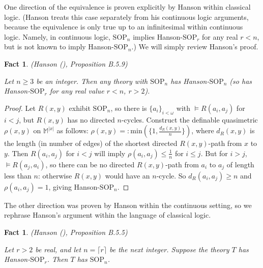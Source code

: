 \documentclass{amsart}
\newtheorem{fact}[theorem]{Fact}
\theoremstyle{definition}
\theoremstyle{remark}
\numberwithin{equation}{section}
\begin{document}
One direction of the equivalence is proven explicitly by Hanson within classical logic. (Hanson treats this case separately from his continuous logic arguments, because the equivalence is only true up to an infinitesimal within continuous logic. Namely, in continuous logic, $\mathrm{SOP}_{n}$ implies Hanson-$\mathrm{SOP}_{r}$ for any real $r < n$, but is not known to imply Hanson-$\mathrm{SOP}_{n}$.) We will simply review Hanson's proof.

\begin{fact}(Hanson (\cite{Hanson2020}), Proposition B.5.9)

 Let $n \geq 3$ be an integer. Then any theory with $\mathrm{SOP}_{n}$ has Hanson-$\mathrm{SOP}_{n}$ (so has Hanson-$\mathrm{SOP}_{r}$ for any real value $r < n$, $r > 2$).
    
\end{fact}

\begin{proof}

Let $R(x, y)$ exhibit $\mathrm{SOP}_{n}$, so there is $\{a_{i}\}_{i < \omega}$ with $\models R(a_{i}, a_{j})$ for $i <j$, but $R(x, y)$ has no directed $n$-cycles. Construct the definable quasimetric $\rho(x, y)$ on $\mathbb{M}^{|x|}$ as follows: $\rho(x, y) =: \mathrm{min}(\{1, \frac{d_{R}(x, y)}{n}
\})$, where $d_{R}(x, y)$ is the length (in number of edges) of the shortest directed $R(x, y)$-path from $x$ to $y$. Then $R(a_{i}, a_{j})$ for $i <j$ will imply $\rho(a_{i}, a_{j}) \leq \frac{1}{n}$ for $i \leq j$. But for $i > j$, $\models R(a_{j}, a_{i})$, so there can be no directed $R(x, y)$-path from $a_i$ to $a_j$ of length less than $n$: otherwise $R(x, y)$ would have an $n$-cycle. So $d_{R}(a_{i}, a_{j}) \geq n$ and $\rho(a_{i}, a_{j}) = 1$, giving Hanson-$\mathrm{SOP}_{n}$.

    
\end{proof}

The other direction was proven by Hanson within the continuous setting, so we rephrase Hanson's argument within the language of classical logic.

\begin{fact}(Hanson (\cite{Hanson2020}), Proposition B.5.5)


Let $r > 2$ be real, and let $n = \lceil r \rceil $ be the next integer. Suppose the theory $T$ has Hanson-$\mathrm{SOP}_{r}$. Then $T$ has $\mathrm{SOP}_{n}$.
    
\end{fact}
\end{document}

